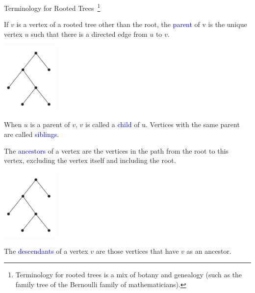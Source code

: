 \documentclass[aspectratio=169]{beamer}
\providecommand{\Blue}[1]{\textcolor{blue}{#1}}
\begin{document}
\begin{frame}[plain]{Terminology for Rooted Trees~\footnote{
    Terminology for rooted trees is a mix of botany and
      genealogy (such as the family tree of the Bernoulli family of
      mathematicians).
      } }
      
 
   If $v$ is a vertex of a rooted tree other than the root, the \Blue{parent} of v is 
    the unique vertex $u$ such that there is a directed edge from $u$ to $v$. 
    \begin{center}
        \includegraphics[height=3.5cm]{./img/lecture9-fig9.png}
      \end{center}
   \pause
   
    When $u$ is a parent of $v$, $v$ is called a \Blue{child} of u. Vertices with
    the same parent are called \Blue{siblings}.   
   
\end{frame}

\begin{frame}[plain]{ }
  
  The \Blue{ancestors} of a vertex are the vertices in the path from the root to this vertex, 
    excluding the vertex itself and including the root. 
    
    \begin{center}
        \includegraphics[height=3.5cm]{./img/lecture9-fig9.png}
      \end{center}
   \pause
   
   The \Blue{descendants} of a vertex $v$ are those vertices that have $v$ as
    an ancestor.
    
\end{frame}
\end{document}

